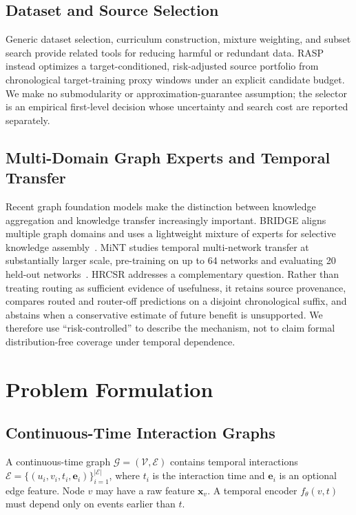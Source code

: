 \documentclass[journal]{IEEEtran}
\begin{document}
\subsection{Dataset and Source Selection}
Generic dataset selection, curriculum construction, mixture weighting, and subset search provide related tools for reducing harmful or redundant data. RASP instead optimizes a target-conditioned, risk-adjusted source portfolio from chronological target-training proxy windows under an explicit candidate budget. We make no submodularity or approximation-guarantee assumption; the selector is an empirical first-level decision whose uncertainty and search cost are reported separately.

\subsection{Multi-Domain Graph Experts and Temporal Transfer}
Recent graph foundation models make the distinction between knowledge aggregation and knowledge transfer increasingly important. BRIDGE aligns multiple graph domains and uses a lightweight mixture of experts for selective knowledge assembly~\cite{yuan2025bridge}. MiNT studies temporal multi-network transfer at substantially larger scale, pre-training on up to 64 networks and evaluating 20 held-out networks~\cite{shamsi2025mint}. HRCSR addresses a complementary question. Rather than treating routing as sufficient evidence of usefulness, it retains source provenance, compares routed and router-off predictions on a disjoint chronological suffix, and abstains when a conservative estimate of future benefit is unsupported. We therefore use ``risk-controlled'' to describe the mechanism, not to claim formal distribution-free coverage under temporal dependence.

\section{Problem Formulation}
\subsection{Continuous-Time Interaction Graphs}
A continuous-time graph $\mathcal{G}=(\mathcal{V},\mathcal{E})$ contains temporal interactions $\mathcal{E}=\{(u_i,v_i,t_i,\mathbf e_i)\}_{i=1}^{|\mathcal E|}$, where $t_i$ is the interaction time and $\mathbf e_i$ is an optional edge feature. Node $v$ may have a raw feature $\mathbf x_v$. A temporal encoder $f_\theta(v,t)$ must depend only on events earlier than $t$.
\end{document}
